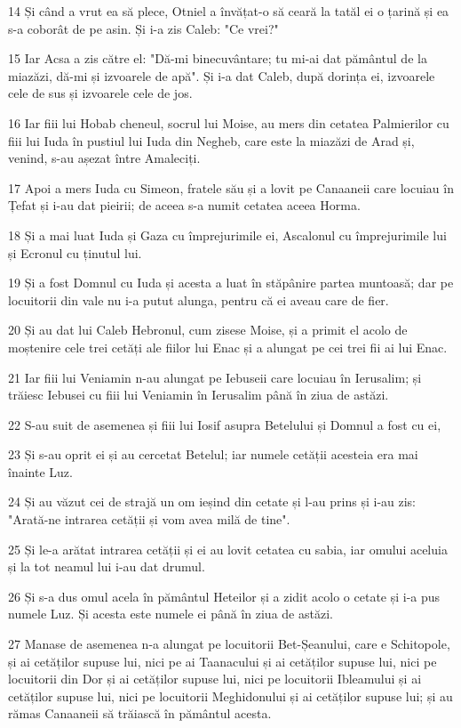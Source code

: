 \par 14 Și când a vrut ea să plece, Otniel a învățat-o să ceară la tatăl ei o țarină și ea s-a coborât de pe asin. Și i-a zis Caleb: "Ce vrei?"
\par 15 Iar Acsa a zis către el: "Dă-mi binecuvântare; tu mi-ai dat pământul de la miazăzi, dă-mi și izvoarele de apă". Și i-a dat Caleb, după dorința ei, izvoarele cele de sus și izvoarele cele de jos.
\par 16 Iar fiii lui Hobab cheneul, socrul lui Moise, au mers din cetatea Palmierilor cu fiii lui Iuda în pustiul lui Iuda din Negheb, care este la miazăzi de Arad și, venind, s-au așezat între Amaleciți.
\par 17 Apoi a mers Iuda cu Simeon, fratele său și a lovit pe Canaaneii care locuiau în Țefat și i-au dat pieirii; de aceea s-a numit cetatea aceea Horma.
\par 18 Și a mai luat Iuda și Gaza cu împrejurimile ei, Ascalonul cu împrejurimile lui și Ecronul cu ținutul lui.
\par 19 Și a fost Domnul cu Iuda și acesta a luat în stăpânire partea muntoasă; dar pe locuitorii din vale nu i-a putut alunga, pentru că ei aveau care de fier.
\par 20 Și au dat lui Caleb Hebronul, cum zisese Moise, și a primit el acolo de moștenire cele trei cetăți ale fiilor lui Enac și a alungat pe cei trei fii ai lui Enac.
\par 21 Iar fiii lui Veniamin n-au alungat pe Iebuseii care locuiau în Ierusalim; și trăiesc Iebusei cu fiii lui Veniamin în Ierusalim până în ziua de astăzi.
\par 22 S-au suit de asemenea și fiii lui Iosif asupra Betelului și Domnul a fost cu ei,
\par 23 Și s-au oprit ei și au cercetat Betelul; iar numele cetății acesteia era mai înainte Luz.
\par 24 Și au văzut cei de strajă un om ieșind din cetate și l-au prins și i-au zis: "Arată-ne intrarea cetății și vom avea milă de tine".
\par 25 Și le-a arătat intrarea cetății și ei au lovit cetatea cu sabia, iar omului aceluia și la tot neamul lui i-au dat drumul.
\par 26 Și s-a dus omul acela în pământul Heteilor și a zidit acolo o cetate și i-a pus numele Luz. Și acesta este numele ei până în ziua de astăzi.
\par 27 Manase de asemenea n-a alungat pe locuitorii Bet-Șeanului, care e Schitopole, și ai cetăților supuse lui, nici pe ai Taanacului și ai cetăților supuse lui, nici pe locuitorii din Dor și ai cetăților supuse lui, nici pe locuitorii Ibleamului și ai cetăților supuse lui, nici pe locuitorii Meghidonului și ai cetăților supuse lui; și au rămas Canaaneii să trăiască în pământul acesta.
